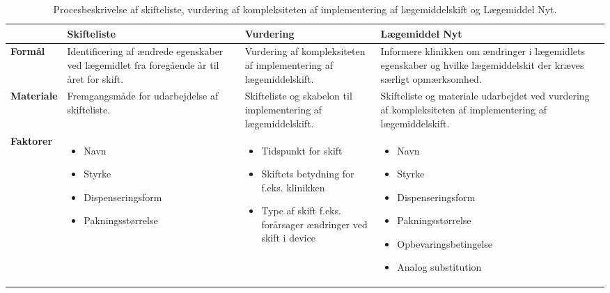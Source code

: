 \begin{table}[H]
\caption{Procesbeskrivelse af skifteliste, vurdering af kompleksiteten af implementering af lægemiddelskift og Lægemiddel Nyt.} 
\label{table:Proces}
\begin{tabular}{|p{1.8cm}|p{3.5cm}|p{3.5cm}|p{4.2cm}|} \hline
\cellcolor[HTML]{C0C0C0}\textbf{} & \cellcolor[HTML]{C0C0C0}\textbf{Skifteliste} & \cellcolor[HTML]{C0C0C0}\textbf{Vurdering} & \cellcolor[HTML]{C0C0C0}\textbf{Lægemiddel Nyt}\\ \hline
\cellcolor[HTML]{C0C0C0}\textbf{Formål} & Identificering af ændrede egenskaber ved lægemidlet fra foregående år til året for skift. & Vurdering af kompleksiteten af implementering af lægemiddelskift. & Informere klinikken om ændringer i lægemidlets egenskaber og hvilke lægemiddelskit der kræves særligt opmærksomhed. \\ \hline
\cellcolor[HTML]{C0C0C0}\textbf{Materiale} & Fremgangsmåde for udarbejdelse af skifteliste. & Skifteliste  og skabelon til implementering af lægemiddelskift. & Skifteliste og materiale udarbejdet ved vurdering af kompleksiteten af implementering af lægemiddelskift. \\ \hline
\cellcolor[HTML]{C0C0C0}\textbf{Faktorer} & \vspace{-0.2cm}\begin{itemize}[topsep=-0.5cm,leftmargin=0.3cm] \item Navn \item Styrke\item Dispenseringsform \item Pakningsstørrelse \end{itemize} & \vspace{-0.2cm}\begin{itemize}[topsep=-0.5cm,leftmargin=0.3cm] \item Tidspunkt for skift\item Skiftets betydning for f.eks. klinikken \item Type af skift f.eks. forårsager ændringer ved skift i device \end{itemize}  & \vspace{-0.2cm}\begin{itemize}[topsep=-0.5cm,leftmargin=0.3cm] \item Navn \item Styrke \item Dispenseringsform \item Pakningsstørrelse \item Opbevaringsbetingelse \item Analog substitution  \end{itemize} \\ \hline  
\end{tabular}
\end{table} 

